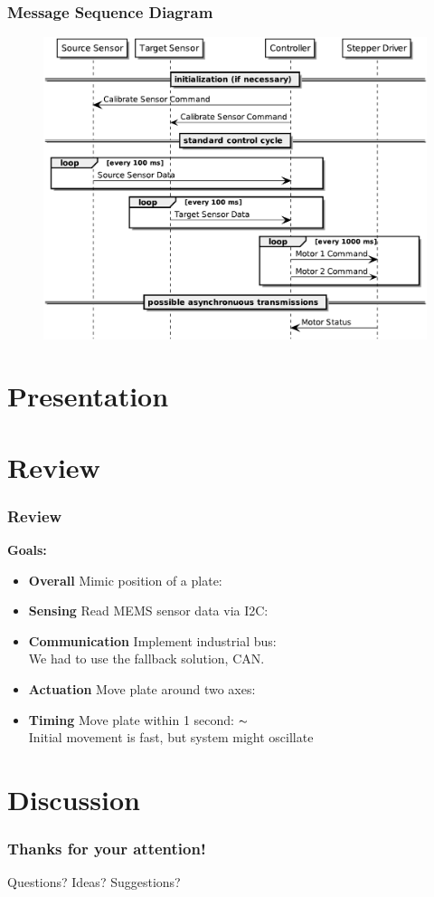 \documentclass{beamer}
\begin{document}
\begin{frame}
  \frametitle{Message Sequence Diagram}
  \begin{figure}
    \includegraphics[height=0.78\textheight]{nes-message_sequence.pdf}
    \vspace{0.05\textheight}
  \end{figure}
\end{frame}

\section{Presentation}

\section{Review}
\begin{frame}
	\frametitle{Review}
	\textbf{Goals:}
	\begin{itemize}
		\item \textbf{Overall} Mimic position of a plate: \checkmark
		\vfill
		\item \textbf{Sensing} Read MEMS sensor data via I2C: \checkmark
		\item \textbf{Communication} Implement industrial bus: \checkmark \\
			We had to use the fallback solution, CAN.
		\item \textbf{Actuation} Move plate around two axes: \checkmark
		\item \textbf{Timing} Move plate within 1 second: $\thicksim$ \\
			Initial movement is fast, but system might oscillate
	\end{itemize}
\end{frame}

\section{Discussion}
\begin{frame}
  \frametitle{Thanks for your attention!}
  \huge{Questions? Ideas? Suggestions?}
\end{frame}
\end{document}
